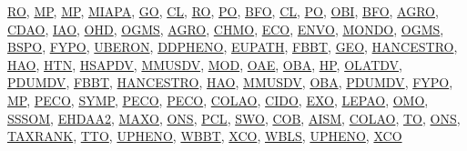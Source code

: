 \documentclass[10pt,a4paper,sans]{moderncv} %
\newcommand{\wikidata}[2]{\href{https://bioregistry.io/wikidata:#1?provider=scholia}{{#2}}}
\begin{document}
        \wikidata{Q28729320}{RO},        \wikidata{Q81661707}{MP},        \wikidata{Q81661707}{MP},        \wikidata{Q81661690}{MIAPA},        \wikidata{Q135085}{GO},        \wikidata{Q55118285}{CL},        \wikidata{Q28729320}{RO},        \wikidata{Q7201529}{PO},        \wikidata{Q4866972}{BFO},        \wikidata{Q55118285}{CL},        \wikidata{Q7201529}{PO},        \wikidata{Q7095051}{OBI},        \wikidata{Q4866972}{BFO},        \wikidata{Q81661533}{AGRO},        \wikidata{Q55118328}{CDAO},        \wikidata{Q55118415}{IAO},        \wikidata{Q55118561}{OHD},        \wikidata{Q55118512}{OGMS},        \wikidata{Q81661533}{AGRO},        \wikidata{Q55118301}{CHMO},        \wikidata{Q28445410}{ECO},        \wikidata{Q31110555}{ENVO},        \wikidata{Q27468140}{MONDO},        \wikidata{Q55118512}{OGMS},        \wikidata{Q81661546}{BSPO},        \wikidata{Q55118393}{FYPO},        \wikidata{Q7876491}{UBERON},        \wikidata{Q81661585}{DDPHENO},        \wikidata{Q81661607}{EUPATH},        \wikidata{Q81661620}{FBBT},        \wikidata{Q81661641}{GEO},        \wikidata{Q81661647}{HANCESTRO},        \wikidata{Q81661648}{HAO},        \wikidata{Q81661655}{HTN},        \wikidata{Q81661653}{HSAPDV},        \wikidata{Q81661698}{MMUSDV},        \wikidata{Q81661700}{MOD},        \wikidata{Q81661725}{OAE},        \wikidata{Q81661730}{OBA},        \wikidata{Q17027854}{HP},        \wikidata{Q81661748}{OLATDV},        \wikidata{Q81661775}{PDUMDV},        \wikidata{Q81661620}{FBBT},        \wikidata{Q81661647}{HANCESTRO},        \wikidata{Q81661648}{HAO},        \wikidata{Q81661698}{MMUSDV},        \wikidata{Q81661730}{OBA},        \wikidata{Q81661775}{PDUMDV},        \wikidata{Q55118393}{FYPO},        \wikidata{Q81661707}{MP},        \wikidata{Q81661777}{PECO},        \wikidata{Q81661810}{SYMP},        \wikidata{Q81661777}{PECO},        \wikidata{Q81661777}{PECO},        \wikidata{Q113009128}{COLAO},        \wikidata{Q110998476}{CIDO},        \wikidata{Q113012658}{EXO},        \wikidata{Q113012667}{LEPAO},        \wikidata{Q113012675}{OMO},        \wikidata{Q108394480}{SSSOM},        \wikidata{Q114667913}{EHDAA2},        \wikidata{Q113012668}{MAXO},        \wikidata{Q113014431}{ONS},        \wikidata{Q113014435}{PCL},        \wikidata{Q113014439}{SWO},        \wikidata{Q113006456}{COB},        \wikidata{Q112972813}{AISM},        \wikidata{Q113009128}{COLAO},        \wikidata{Q81661818}{TO},        \wikidata{Q113014431}{ONS},        \wikidata{Q81661813}{TAXRANK},        \wikidata{Q81661821}{TTO},        \wikidata{Q81661827}{UPHENO},        \wikidata{Q81661834}{WBBT},        \wikidata{Q81661839}{XCO},        \wikidata{Q81661837}{WBLS},        \wikidata{Q81661827}{UPHENO},        \wikidata{Q81661839}{XCO}
\end{document}
